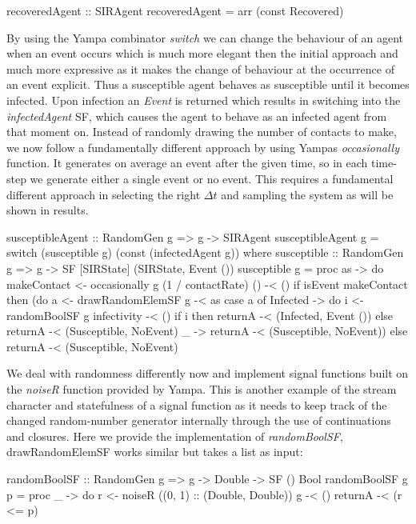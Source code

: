 \begin{HaskellCode}
recoveredAgent :: SIRAgent
recoveredAgent = arr (const Recovered)
\end{HaskellCode}

By using the Yampa combinator \textit{switch} we can change the behaviour of an agent when an event occurs which is much more elegant then the initial approach and much more expressive as it makes the change of behaviour at the occurrence of an event explicit. Thus a susceptible agent behaves as susceptible until it becomes infected. Upon infection an \textit{Event} is returned which results in switching into the \textit{infectedAgent} SF, which causes the agent to behave as an infected agent from that moment on. Instead of randomly drawing the number of contacts to make, we now follow a fundamentally different approach by using Yampas \textit{occasionally} function. It generates on average an event after the given time, so in each time-step we generate either a single event or no event. This requires a fundamental different approach in selecting the right $\Delta t$ and sampling the system as will be shown in results. 

\begin{HaskellCode}
susceptibleAgent :: RandomGen g => g -> SIRAgent
susceptibleAgent g = switch (susceptible g) (const (infectedAgent g))
  where
    susceptible :: RandomGen g => g -> SF [SIRState] (SIRState, Event ())
    susceptible g = proc as -> do
      makeContact <- occasionally g (1 / contactRate) () -< ()
      if isEvent makeContact
        then (do
          a <- drawRandomElemSF g -< as
          case a of
            Infected -> do
              i <- randomBoolSF g infectivity -< ()
              if i
                then returnA -< (Infected, Event ())
                else returnA -< (Susceptible, NoEvent)
             _       -> returnA -< (Susceptible, NoEvent))
        else returnA -< (Susceptible, NoEvent)
\end{HaskellCode}

We deal with randomness differently now and implement signal functions built on the \textit{noiseR} function provided by Yampa. This is another example of the stream character and statefulness of a signal function as it needs to keep track of the changed random-number generator internally through the use of continuations and closures. Here we provide the implementation of \textit{randomBoolSF}, drawRandomElemSF works similar but takes a list as input:

\begin{HaskellCode}
randomBoolSF :: RandomGen g => g -> Double -> SF () Bool
randomBoolSF g p = proc _ -> do
  r <- noiseR ((0, 1) :: (Double, Double)) g -< ()
  returnA -< (r <= p)
\end{HaskellCode}

